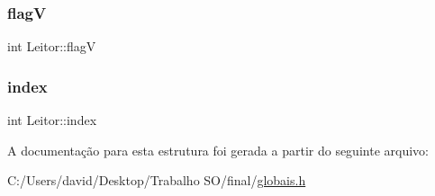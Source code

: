 \mbox{\label{struct_leitor_a9a9c238f52f53e89c260aa9eb62c0c93}} 
\subsubsection{\texorpdfstring{flagV}{flagV}}
{\footnotesize\ttfamily int Leitor\+::flagV}

\mbox{\label{struct_leitor_a5591befb6df369eed6b23e33520857c1}} 
\subsubsection{\texorpdfstring{index}{index}}
{\footnotesize\ttfamily int Leitor\+::index}



A documentação para esta estrutura foi gerada a partir do seguinte arquivo\+:\begin{DoxyCompactItemize}
\item 
C\+:/\+Users/david/\+Desktop/\+Trabalho S\+O/final/\hyperlink{globais_8h}{globais.\+h}\end{DoxyCompactItemize}
